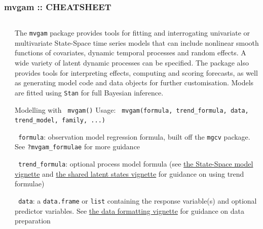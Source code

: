 \documentclass[final,9pt,fleqn]{beamer}\usepackage[]{graphicx}\usepackage[]{xcolor}
\begin{document}
\begin{frame}[fragile]
  \frametitle{{\fontsize{41}{43} \selectfont \textcolor{mygray}{mvgam ::}} {\fontsize{25}{25} \textbf{\textcolor{mygray}{CHEATSHEET}}}}
\vspace{-0.6in}
  \begin{columns}
    \begin{column}{0.02\paperwidth} %
    \end{column}

    \begin{column}{0.3\paperwidth}

\begin{block}
\noindent\makebox[\linewidth]{\rule{0.3\paperwidth}{0.2pt}}

The \texttt{mvgam} package provides tools for fitting and interrogating univariate or multivariate State-Space time series models that can include nonlinear smooth functions of covariates, dynamic temporal processes and random effects. A wide variety of latent dynamic processes can be specified. The package also provides tools for interpreting effects, computing and scoring forecasts, as well as generating model code and data objects for further customisation. Models are fitted using \texttt{Stan} for full Bayesian inference.

\end{block}

\begin{block}{{\fontsize{21}{21} \selectfont \color{BrickRed} Modelling with \texttt{\color{Orchid} mvgam()}}}
Usage: \texttt{\color{Orchid} mvgam(formula, trend\_formula, data, trend\_model, family, ...)}

\medskip
\texttt{\color{Orchid} formula}: observation model regression formula, built off the \texttt{mgcv} package. See \texttt{\color{Orchid}?mvgam\_formulae} for more guidance

\medskip
\texttt{\color{Orchid} trend\_formula}: optional process model formula (see \href{https://nicholasjclark.github.io/mvgam/articles/trend_formulas.html}{the State-Space model vignette} and \href{https://nicholasjclark.github.io/mvgam/articles/trend_formulas.html}{the shared latent states vignette} for guidance on using trend formulae)

\medskip
\texttt{\color{Orchid} data}: a \texttt{data.frame} or \texttt{list} containing the response variable(s) and optional predictor variables. See \href{https://nicholasjclark.github.io/mvgam/articles/data_in_mvgam.html}{the data formatting vignette} for guidance on data preparation


\end{block}
\end{column}
\end{columns}
\end{frame}
\end{document}
